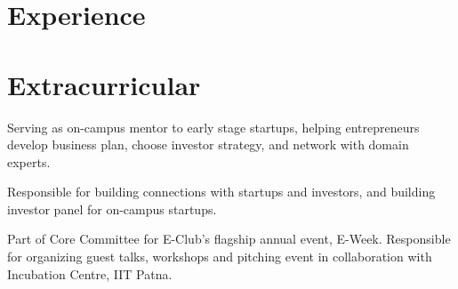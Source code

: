 \documentclass[]{deedy-resume-openfont}%
\begin{document}
\begin{minipage}[t]{0.72\textwidth}
\section{Experience}%
%
%
%
\begin{tightemize}%
\item 
\end{tightemize}%
\sectionsep
%
%
%
%
\begin{tightemize}%
\item 
\end{tightemize}%
\sectionsep
%
\section{Extracurricular}%
%
%
%
\begin{tightemize}
\item Serving as on-campus mentor to early stage startups, helping entrepreneurs develop business plan, choose investor strategy, and network with domain experts.
\item Responsible for building connections with startups and investors, and building investor panel for on-campus startups.
\item Part of Core Committee for E-Club’s flagship annual event, E-Week. Responsible for organizing guest talks, workshops and pitching event in collaboration with Incubation Centre, IIT Patna.
\end{tightemize}
\sectionsep
%
\end{minipage}%
\end{document}
